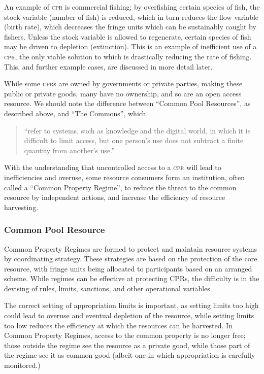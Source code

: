 \documentclass[]{article} %
\begin{document}
An example of \textsc{cpr} is commercial fishing; by overfishing certain species of fish, the stock variable (number of fish) is reduced, which in turn reduces the flow variable (birth rate), which decreases the fringe units which can be sustainably caught by fishers. Unless the stock variable is allowed to regenerate, certain species of fish may be driven to depletion (extinction). This is an example of inefficient use of a \textsc{cpr}, the only viable solution to which is drastically reducing the rate of fishing. This, and further example cases, are discussed in more detail later.

While some \textsc{cpr}s are owned by governments or private parties, making these public or private goods, many have no ownership, and so are an open access resource. We should note the difference between “Common Pool Resources”, as described above, and “The Commons”, which

\begin{quote}
	“refer to systems, such as knowledge and the digital world, in which it is difficult to limit access, but one person’s use does not subtract a finite quantity from another’s use.”~\cite{Ostrom-challenge-90}
\end{quote}

With the understanding that uncontrolled access to a \textsc{cpr} will lead to inefficiencies and overuse, some resource consumers form an institution, often called a “Common Property Regime”, to reduce the threat to the common resource by independent actions, and increase the efficiency of resource harvesting.

\subsubsection{Common Pool Resource}

Common Property Regimes are formed to protect and maintain resource systems by coordinating strategy. These strategies are based on the protection of the core resource, with fringe units being allocated to participants based on an arranged scheme. While regimes can be effective at protecting \textsc{CPR}s, the difficulty is in the devising of rules, limits, sanctions, and other operational variables.

The correct setting of appropriation limits is important, as setting limits too high could lead to overuse and eventual depletion of the resource, while setting limits too low reduces the efficiency at which the resources can be harvested. In Common Property Regimes, access to the common property is no longer free; those outside the regime see the resource as a private good, while those part of the regime see it as common good (albeit one in which appropriation is carefully monitored.)
\end{document}
